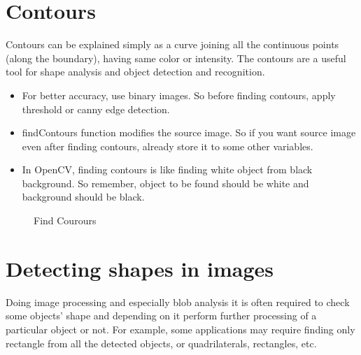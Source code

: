 \section{Contours}
Contours can be explained simply as a curve joining all the continuous points (along the boundary), having same color or intensity. The contours are a useful tool for shape analysis and object detection and recognition. \cite{Contours}
\begin{itemize}
\item For better accuracy, use binary images. So before finding contours, apply threshold or canny edge detection.
\item findContours function modifies the source image. So if you want source image even after finding contours, already store it to some other variables.
\item In OpenCV, finding contours is like finding white object from black background. So remember, object to be found should be white and background should be black.
\end{itemize}
\begin{figure}[H]
\centering
{}
\caption {Find Courours}
\label {fig:Amino_Acid}
\end{figure}
\section{Detecting shapes in images}
\label{Shape}
Doing image processing and especially blob analysis it is often required to check some objects' shape and depending on it perform further processing of a particular object or not. For example, some applications may require finding only rectangle from all the detected objects, or quadrilaterals, rectangles, etc.
